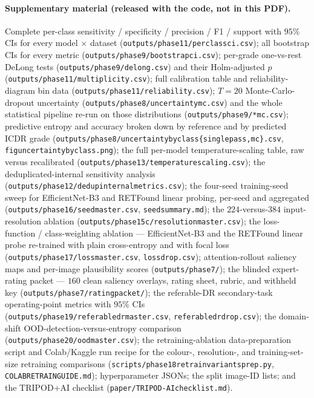 \documentclass[journal]{IEEEtran}
\renewcommand{\_}{\origunderscore\allowbreak}
\begin{document}
{\raggedright
\paragraph{Supplementary material (released with the code, not in this PDF).}
Complete per-class sensitivity / specificity / precision / F1 / support with
$95\%$ CIs for every model $\times$ dataset
(\texttt{outputs/\allowbreak{}phase11/\allowbreak{}per\_class\_ci.csv}); all bootstrap CIs for every metric
(\texttt{outputs/\allowbreak{}phase9/\allowbreak{}bootstrap\_ci.csv}); per-grade one-vs-rest DeLong tests
(\texttt{outputs/\allowbreak{}phase9/\allowbreak{}delong.csv}) and their Holm-adjusted $p$
(\texttt{outputs/\allowbreak{}phase11/\allowbreak{}multiplicity.csv}); full calibration table and
reliability-diagram bin data (\texttt{outputs/\allowbreak{}phase11/\allowbreak{}reliability\_*.csv});
$T=20$ Monte-Carlo-dropout uncertainty
(\texttt{outputs/\allowbreak{}phase8/\allowbreak{}uncertainty\_mc.csv}) and the whole statistical pipeline
re-run on those distributions (\texttt{outputs/\allowbreak{}phase9/\allowbreak{}*\_mc.csv}); predictive
entropy and accuracy broken down by reference and by predicted ICDR grade
(\texttt{outputs/\allowbreak{}phase8/\allowbreak{}uncertainty\_by\_class\_\{singlepass,mc\}.csv},
\texttt{fig\_uncertainty\_byclass\_*.png}); the full per-model
temperature-scaling table, raw versus recalibrated
(\texttt{outputs/\allowbreak{}phase13/\allowbreak{}temperature\_scaling.csv}); the deduplicated-internal
sensitivity analysis (\texttt{outputs/\allowbreak{}phase12/\allowbreak{}dedup\_internal\_metrics.csv});
the four-seed training-seed sweep for EfficientNet-B3 and RETFound linear
probing, per-seed and aggregated (\texttt{outputs/\allowbreak{}phase16/\allowbreak{}seed\_master.csv},
\texttt{seed\_summary.md}); the $224$-versus-$384$ input-resolution ablation
(\texttt{outputs/\allowbreak{}phase15c/\allowbreak{}resolution\_master.csv}); the loss-function /
class-weighting ablation --- EfficientNet-B3 and the RETFound linear probe
re-trained with plain cross-entropy and with focal loss
(\texttt{outputs/\allowbreak{}phase17/\allowbreak{}loss\_master.csv}, \texttt{loss\_drop.csv});
attention-rollout saliency maps and per-image plausibility scores
(\texttt{outputs/\allowbreak{}phase7/\allowbreak{}}); the blinded expert-rating packet --- $160$ clean
saliency overlays, rating sheet, rubric, and withheld key
(\texttt{outputs/\allowbreak{}phase7/\allowbreak{}rating\_packet/\allowbreak{}}); the referable-DR secondary-task
operating-point metrics with $95\%$ CIs
(\texttt{outputs/\allowbreak{}phase19/\allowbreak{}referable\_dr\_master.csv},
\texttt{referable\_dr\_drop.csv}); the domain-shift OOD-detection-versus-entropy
comparison (\texttt{outputs/\allowbreak{}phase20/\allowbreak{}ood\_master.csv}); the retraining-ablation
data-preparation script and Colab/Kaggle run recipe for the colour-,
resolution-, and training-set-size retraining comparisons
(\texttt{scripts/\allowbreak{}phase18\_retrain\_variants\_prep.py},
\texttt{COLAB\_RETRAIN\_GUIDE.md}); hyperparameter JSONs; the split image-ID
lists; and the TRIPOD+AI checklist (\texttt{paper/\allowbreak{}TRIPOD-AI\_checklist.md}).
\par}
\end{document}
